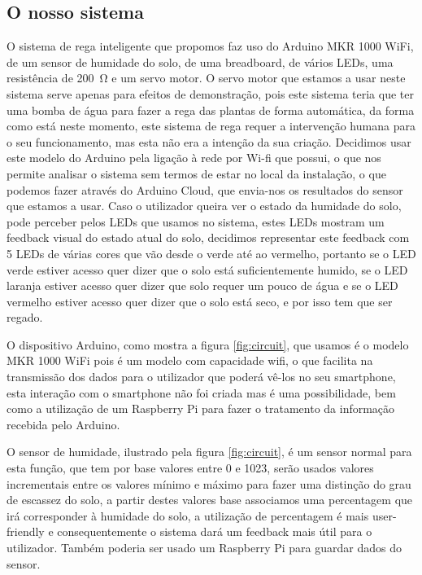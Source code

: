 \documentclass[conference]{IEEEtran}
\begin{document}
\subsection{O nosso sistema}

O sistema de rega inteligente que propomos faz uso do Arduino MKR 1000 WiFi, 
de um sensor de humidade do solo, de uma breadboard, de vários LEDs, uma 
resistência de \SI{200}{\ohm} e um servo motor. O servo motor que estamos a 
usar neste sistema serve apenas para efeitos de demonstração, pois 
este sistema teria que ter uma bomba de água para fazer a rega 
das plantas de forma automática, da forma como está neste momento, este 
sistema de rega requer a intervenção humana para o seu funcionamento, mas 
esta não era a intenção da sua criação.
Decidimos usar este modelo do Arduino pela ligação 
à rede por Wi-fi que possui, o que nos permite analisar o sistema sem termos de 
estar no local da instalação, o que podemos fazer através do Arduino Cloud, 
que envia-nos os resultados do sensor que estamos a usar. Caso o utilizador 
queira ver o estado da humidade do solo, pode perceber pelos LEDs que usamos no sistema, 
estes LEDs mostram um feedback visual do estado atual do solo, decidimos representar este 
feedback com 5 LEDs de várias cores que vão desde o verde até ao vermelho, portanto 
se o LED verde estiver acesso quer dizer que o solo está suficientemente humido, se 
o LED laranja estiver acesso quer dizer que solo requer um pouco de água e se o LED
vermelho estiver acesso quer dizer que o solo está seco, e por isso tem que ser regado.

O dispositivo Arduino, como mostra a figura \ref{fig:circuit}, que usamos é o 
modelo MKR 1000 WiFi pois é um modelo com capacidade wifi, o que facilita na 
transmissão dos dados para o utilizador que poderá vê-los no seu smartphone, 
esta interação com o smartphone não foi criada mas é uma possibilidade, bem 
como a utilização de um Raspberry Pi para fazer o tratamento da informação 
recebida pelo Arduino.

O sensor de humidade, ilustrado pela figura \ref{fig:circuit}, é um 
sensor normal para esta função, que tem por base valores entre 0 e 1023, serão usados valores 
incrementais entre os valores mínimo e máximo para fazer uma distinção do grau 
de escassez do solo, a partir destes valores base associamos uma percentagem 
que irá corresponder à humidade do solo, a utilização de percentagem é 
mais user-friendly e consequentemente o sistema dará um feedback mais útil
para o utilizador. Também poderia ser usado um Raspberry Pi para guardar dados do sensor.
\end{document}
